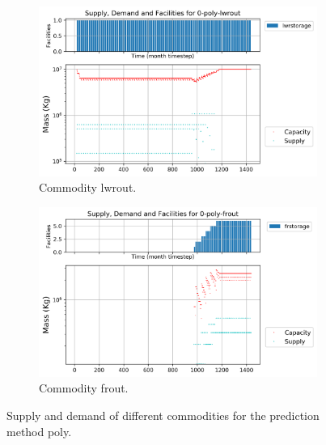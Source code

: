 \documentclass[11pt]{article}
\begin{document}
\begin{figure}[H]
	\centering
	\begin{subfigure}[]{0.45\textwidth}
		\centering
		\includegraphics[width=\linewidth]{23-figures/0-poly-lwrout.png} 
		\caption{Commodity lwrout.}
		\label{fig:23-lwrout}
	\end{subfigure}
	\vspace{1cm}
	\begin{subfigure}[]{0.45\textwidth}
		\centering
		\includegraphics[width=\linewidth]{23-figures/0-poly-frout.png} 
		\caption{Commodity frout.}
		\label{fig:23-frout}
	\end{subfigure}
	\hfill
	\caption{Supply and demand of different commodities for the prediction method poly.}
	\label{fig:23-out}
\end{figure}
\end{document}
